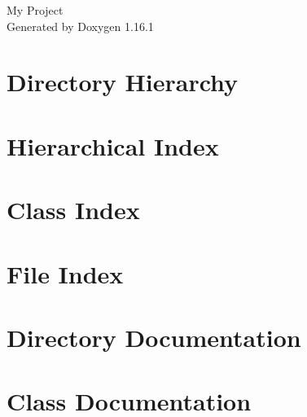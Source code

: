 \documentclass[twoside]{book}
\newcommand{\+}{\discretionary{\mbox{\scriptsize$\hookleftarrow$}}{}{}}
\newcommand{\clearemptydoublepage}{%
    \newpage{\pagestyle{empty}\cleardoublepage}%
  }
\begin{document}
  \raggedbottom
    \hypersetup{pageanchor=false,
                bookmarksnumbered=true,
                pdfencoding=unicode
               }
  \begin{titlepage}
  \vspace*{7cm}
  \begin{center}%
  {\Large My Project}\\
  \vspace*{1cm}
  {\large Generated by Doxygen 1.16.1}\\
  \end{center}
  \end{titlepage}
  \clearemptydoublepage
  \tableofcontents
  \clearemptydoublepage
  \hypersetup{pageanchor=true}

\chapter{Directory Hierarchy}

\chapter{Hierarchical Index}

\chapter{Class Index}

\chapter{File Index}

\chapter{Directory Documentation}



\chapter{Class Documentation}























\end{document}
